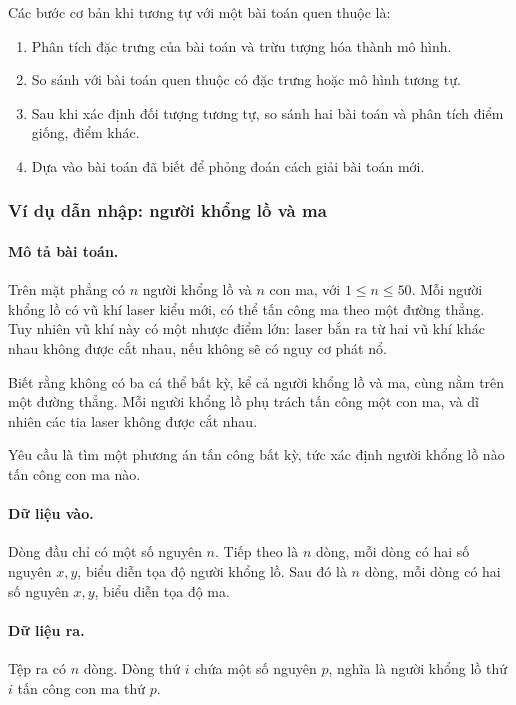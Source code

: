 \documentclass[11pt]{article}
\begin{document}
Các bước cơ bản khi tương tự với một bài toán quen thuộc là:
\begin{enumerate}
  \item {} Phân tích đặc trưng của bài toán và trừu tượng hóa
  thành mô hình.
  \item {} So sánh với bài toán quen thuộc có đặc trưng hoặc
  mô hình tương tự.
  \item {} Sau khi xác định đối tượng tương tự, so sánh hai bài
  toán và phân tích điểm giống, điểm khác.
  \item {} Dựa vào bài toán đã biết để phỏng đoán cách giải
  bài toán mới.
\end{enumerate}

\subsubsection*{Ví dụ dẫn nhập: người khổng lồ và ma}

\paragraph{Mô tả bài toán.}
Trên mặt phẳng có \(n\) người khổng lồ và \(n\) con ma, với
\(1\le n\le 50\). Mỗi người khổng lồ có vũ khí laser kiểu mới, có thể tấn
công ma theo một đường thẳng. Tuy nhiên vũ khí này có một nhược điểm lớn:
laser bắn ra từ hai vũ khí khác nhau không được cắt nhau, nếu không sẽ có
nguy cơ phát nổ.

Biết rằng không có ba cá thể bất kỳ, kể cả người khổng lồ và ma, cùng nằm
trên một đường thẳng. Mỗi người khổng lồ phụ trách tấn công một con ma, và
dĩ nhiên các tia laser không được cắt nhau.

Yêu cầu là tìm một phương án tấn công bất kỳ, tức xác định người khổng lồ nào
tấn công con ma nào.

\paragraph{Dữ liệu vào.}
Dòng đầu chỉ có một số nguyên \(n\). Tiếp theo là \(n\) dòng, mỗi dòng có hai
số nguyên \(x,y\), biểu diễn tọa độ người khổng lồ. Sau đó là \(n\) dòng,
mỗi dòng có hai số nguyên \(x,y\), biểu diễn tọa độ ma.

\paragraph{Dữ liệu ra.}
Tệp ra có \(n\) dòng. Dòng thứ \(i\) chứa một số nguyên \(p\), nghĩa là người
khổng lồ thứ \(i\) tấn công con ma thứ \(p\).
\end{document}
